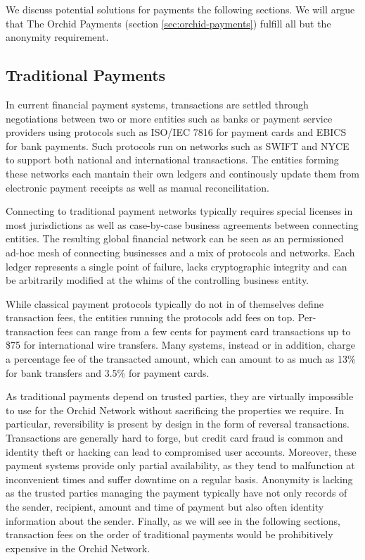 We discuss potential solutions for payments the following sections. We will argue that The Orchid Payments (section \ref{sec:orchid-payments}) fulfill all but the anonymity requirement.

\subsection{Traditional Payments}

In current financial payment systems, transactions are settled through negotiations between two or more entities such as banks or payment service providers\cite{PSP} using protocols such as ISO/IEC 7816\cite{ISO7816} for payment cards and EBICS\cite{EBICS} for bank payments. Such protocols run on networks such as SWIFT\cite{SWIFT} and NYCE\cite{NYCE} to support both national and international transactions. The entities forming these networks each mantain their own ledgers and continously update them from electronic payment receipts as well as manual reconcilitation\cite{Reconcil}.

Connecting to traditional payment networks typically requires special licenses in most jurisdictions as well as case-by-case business agreements between connecting entities. The resulting global financial network can be seen as an permissioned ad-hoc mesh of connecting businesses and a mix of protocols and networks. Each ledger represents a single point of failure, lacks cryptographic integrity and can be arbitrarily modified at the whims of the controlling business entity.

While classical payment protocols typically do not in of themselves define transaction fees, the entities running the protocols add fees on top. Per-transaction fees can range from a few cents for payment card transactions\cite{CardFees1} up to \$75 for international wire transfers\cite{WireTransfers1}. Many systems, instead or in addition, charge a percentage fee of the transacted amount, which can amount to as much as 13\% for bank transfers\cite{WireTransfers2} and 3.5\% for payment cards\cite{CardFees2}.

As traditional payments depend on trusted parties, they are virtually impossible to use for the Orchid Network without sacrificing the properties we require. In particular, reversibility is present by design in the form of reversal transactions\cite{CardProcessing}. Transactions are generally hard to forge, but credit card fraud is common and identity theft or hacking can lead to compromised user accounts. Moreover, these payment systems provide only partial availability, as they tend to malfunction at inconvenient times and suffer downtime on a regular basis. Anonymity is lacking as the trusted parties managing the payment typically have not only records of the sender, recipient, amount and time of payment but also often identity information about the sender. Finally, as we will see in the following sections, transaction fees on the order of traditional payments would be prohibitively expensive in the Orchid Network.

